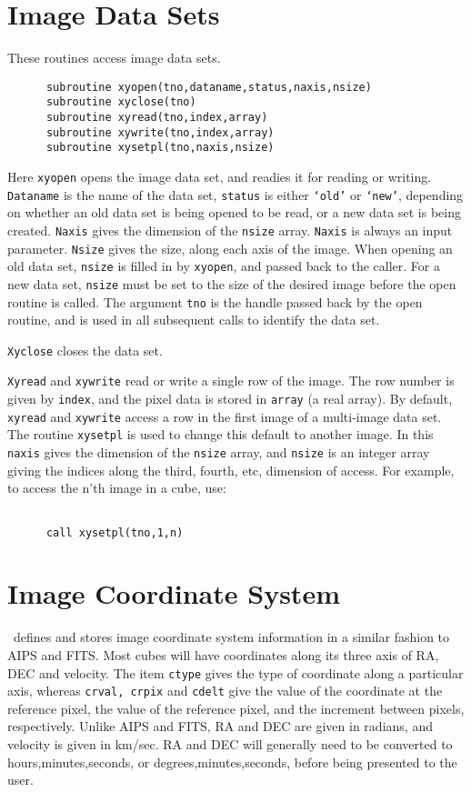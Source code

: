 \documentclass{report}
\begin{document}
\section{Image Data Sets}
These routines access image data sets.
\begin{verbatim}
      subroutine xyopen(tno,dataname,status,naxis,nsize)
      subroutine xyclose(tno)
      subroutine xyread(tno,index,array)
      subroutine xywrite(tno,index,array)
      subroutine xysetpl(tno,naxis,nsize)
\end{verbatim}
Here {\tt xyopen} opens the image data set, and readies it for reading or
writing. {\tt Dataname} is the name of the data set, {\tt status} is either
{\tt `old'} or {\tt `new'}, depending on whether an old data set is being opened
to be read, or a new data set is being created. {\tt Naxis} gives the dimension
of the {\tt nsize} array. {\tt Naxis} is always an input parameter.
{\tt Nsize} gives the size, along each axis of the
image. When opening an old data set, {\tt nsize} is filled in by {\tt xyopen},
and passed back to the caller. For a new data set, {\tt nsize} must be set to the
size of the desired image before the open routine is called. The argument
{\tt tno} is the handle passed back by the open routine, and is used
in all subsequent calls to identify the data set.

{\tt Xyclose} closes the data set.

{\tt Xyread} and {\tt xywrite} read or write a single row of the image.
The row number is given by {\tt index}, and the pixel data is stored in
{\tt array} (a real array). By default, {\tt xyread} and {\tt xywrite} access
a row in the first image of a multi-image data set. The routine {\tt xysetpl}
is used to change this default to another image. In this {\tt naxis} gives the
dimension of the {\tt nsize} array, and {\tt nsize} is an integer array
giving the indices along the third, fourth, etc, dimension of access. For
example, to access the n'th image in a cube, use:
\begin{verbatim}

      call xysetpl(tno,1,n)

\end{verbatim}

\section{Image Coordinate System}
\miriad\ defines and stores image coordinate system information in a similar
fashion to AIPS and FITS. Most cubes will have coordinates along its three
axis of RA, DEC and velocity. The item {\tt ctype} gives the
type of coordinate along a particular axis, whereas {\tt crval, crpix} and
{\tt cdelt} give the value of the coordinate at the reference pixel, the
value of the reference pixel, and the increment between pixels, respectively.
Unlike AIPS and FITS, RA and DEC are given in radians, and velocity is given
in km/sec. RA and DEC will generally need to be converted to
hours,minutes,seconds, or degrees,minutes,seconds, before being presented
to the user.
\end{document}
